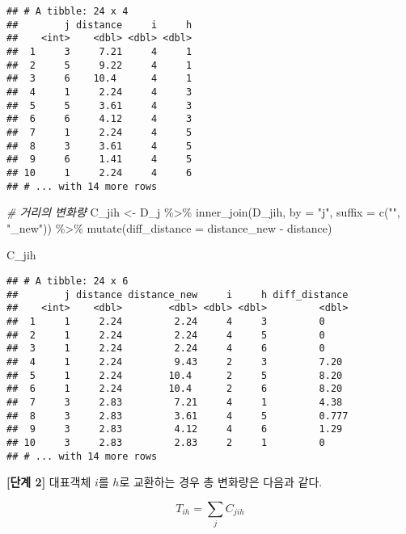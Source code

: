 \documentclass[
]{book}
\newenvironment{Shaded}{\begin{snugshade}}{\end{snugshade}}
\newcommand{\AttributeTok}[1]{\textcolor[rgb]{0.77,0.63,0.00}{#1}}
\newcommand{\CommentTok}[1]{\textcolor[rgb]{0.56,0.35,0.01}{\textit{#1}}}
\newcommand{\FunctionTok}[1]{\textcolor[rgb]{0.00,0.00,0.00}{#1}}
\newcommand{\NormalTok}[1]{#1}
\newcommand{\OtherTok}[1]{\textcolor[rgb]{0.56,0.35,0.01}{#1}}
\newcommand{\SpecialCharTok}[1]{\textcolor[rgb]{0.00,0.00,0.00}{#1}}
\newcommand{\StringTok}[1]{\textcolor[rgb]{0.31,0.60,0.02}{#1}}
\begin{document}
\begin{verbatim}
## # A tibble: 24 x 4
##        j distance     i     h
##    <int>    <dbl> <dbl> <dbl>
##  1     3     7.21     4     1
##  2     5     9.22     4     1
##  3     6    10.4      4     1
##  4     1     2.24     4     3
##  5     5     3.61     4     3
##  6     6     4.12     4     3
##  7     1     2.24     4     5
##  8     3     3.61     4     5
##  9     6     1.41     4     5
## 10     1     2.24     4     6
## # ... with 14 more rows
\end{verbatim}

\begin{Shaded}
\begin{Highlighting}[]
\CommentTok{\# 거리의 변화량}
\NormalTok{C\_jih }\OtherTok{\textless{}{-}}\NormalTok{ D\_j }\SpecialCharTok{\%\textgreater{}\%}
  \FunctionTok{inner\_join}\NormalTok{(D\_jih, }\AttributeTok{by =} \StringTok{"j"}\NormalTok{, }\AttributeTok{suffix =} \FunctionTok{c}\NormalTok{(}\StringTok{""}\NormalTok{, }\StringTok{"\_new"}\NormalTok{)) }\SpecialCharTok{\%\textgreater{}\%}
  \FunctionTok{mutate}\NormalTok{(}\AttributeTok{diff\_distance =}\NormalTok{ distance\_new }\SpecialCharTok{{-}}\NormalTok{ distance)}

\NormalTok{C\_jih}
\end{Highlighting}
\end{Shaded}

\begin{verbatim}
## # A tibble: 24 x 6
##        j distance distance_new     i     h diff_distance
##    <int>    <dbl>        <dbl> <dbl> <dbl>         <dbl>
##  1     1     2.24         2.24     4     3         0    
##  2     1     2.24         2.24     4     5         0    
##  3     1     2.24         2.24     4     6         0    
##  4     1     2.24         9.43     2     3         7.20 
##  5     1     2.24        10.4      2     5         8.20 
##  6     1     2.24        10.4      2     6         8.20 
##  7     3     2.83         7.21     4     1         4.38 
##  8     3     2.83         3.61     4     5         0.777
##  9     3     2.83         4.12     4     6         1.29 
## 10     3     2.83         2.83     2     1         0    
## # ... with 14 more rows
\end{verbatim}

\textbf{{[}단계 2{]}} 대표객체 \(i\)를 \(h\)로 교환하는 경우 총 변화량은 다음과 같다.

\begin{equation*}
T_{ih} = \sum_{j} C_{jih}
\end{equation*}
\end{document}

